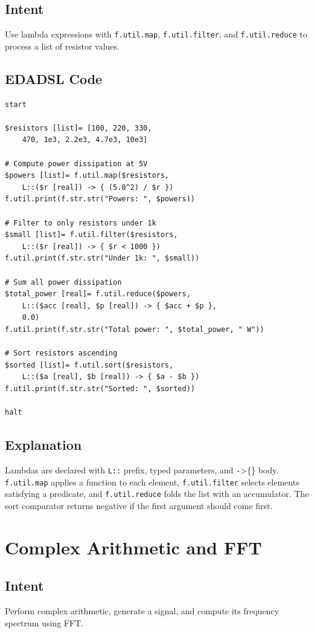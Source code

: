 \subsection{Intent}
Use lambda expressions with \texttt{f.util.map}, \texttt{f.util.filter}, and \texttt{f.util.reduce} to process a list of resistor values.

\subsection{EDADSL Code}
\begin{verbatim}
start

$resistors [list]= [100, 220, 330,
    470, 1e3, 2.2e3, 4.7e3, 10e3]

# Compute power dissipation at 5V
$powers [list]= f.util.map($resistors,
    L::($r [real]) -> { (5.0^2) / $r })
f.util.print(f.str.str("Powers: ", $powers))

# Filter to only resistors under 1k
$small [list]= f.util.filter($resistors,
    L::($r [real]) -> { $r < 1000 })
f.util.print(f.str.str("Under 1k: ", $small))

# Sum all power dissipation
$total_power [real]= f.util.reduce($powers,
    L::($acc [real], $p [real]) -> { $acc + $p },
    0.0)
f.util.print(f.str.str("Total power: ", $total_power, " W"))

# Sort resistors ascending
$sorted [list]= f.util.sort($resistors,
    L::($a [real], $b [real]) -> { $a - $b })
f.util.print(f.str.str("Sorted: ", $sorted))

halt
\end{verbatim}

\subsection{Explanation}
Lambdas are declared with \texttt{L::} prefix, typed parameters, and \texttt->\{\} body. \texttt{f.util.map} applies a function to each element, \texttt{f.util.filter} selects elements satisfying a predicate, and \texttt{f.util.reduce} folds the list with an accumulator. The sort comparator returns negative if the first argument should come first.

\section{Complex Arithmetic and FFT}
\subsection{Intent}
Perform complex arithmetic, generate a signal, and compute its frequency spectrum using FFT.

